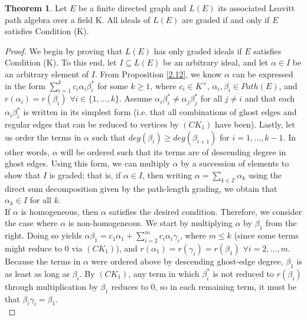 \documentclass[12pt]{amsart}
\theoremstyle{plain} \numberwithin{equation}{section}
\theoremstyle{definition}
\newtheorem{thm}{Theorem}
\theoremstyle{definition}
\begin{document}
\begin{thm}\label{2}
  Let $E$ be a finite directed graph and $L(E)$ its associated Leavitt path algebra over a field K. All ideals of $L(E)$ are graded if and only if $E$ satisfies Condition (K).
\end{thm}
\begin{proof} We begin by proving that $L(E)$ has only graded ideals if $E$ satisfies Condition (K). To this end, let $I\subseteq L(E)$ be an arbitrary ideal, and let $\alpha\in I$ be an arbitrary element of $I$. From Proposition \ref{2.12}, we know $\alpha$ can be expressed in the form $\sum_{i=1}^k c_i\alpha_i\beta_i^*$ for some $k\geq1$, where $c_i\in K^\times$, $\alpha_i,\beta_i\in Path(E)$, and $r(\alpha_i) = r(\beta_i)$ $\forall i\in \{1,\dots ,k\}$. Assume $\alpha_i\beta_i^* \neq \alpha_j\beta_j^*$ for all $j\neq i$ and that each $\alpha_i\beta_i^*$ is written in its simplest form (i.e. that all combinations of ghost edges and regular edges that can be reduced to vertices by $(CK_1)$ have been). Lastly, let us order the terms in $\alpha$ such that $deg(\beta_i)\geq deg(\beta_{i+1})$ for $i=1,\dots ,k-1$. In other words, $\alpha$ will be ordered such that its terms are of descending degree in ghost edges. Using this form, we can multiply $\alpha$ by a succession of elements to show that $I$ is graded; that is, if $\alpha\in I$, then writing $\alpha = \sum_{k \in\mathbb{Z}} \alpha_k$ using the direct sum decomposition given by the path-length grading, we obtain that $\alpha_k \in I$ for all $k$. \\

If $\alpha$ is homogeneous, then $\alpha$ satisfies the desired condition. Therefore, we consider the case where $\alpha$ is non-homogeneous. We start by multiplying $\alpha$ by $\beta_1$ from the right. Doing so yields $\alpha\beta_1 = c_1\alpha_1 + \sum_{i=2}^mc_i\alpha_i\gamma_i$, where $m\leq k$ (since some terms might reduce to 0 via $(CK_1)$), and $r(\alpha_1) = r(\gamma_i) = r(\beta_1)$ $\forall i = 2,\dots ,m$. Because the terms in $\alpha$ were ordered above by descending ghost-edge degree, $\beta_1$ is as least as long as $\beta_i$. By $(CK_1)$, any term in which $\beta_i^*$ is not reduced to $r(\beta_i)$ through multiplication by $\beta_1$ reduces to 0, so in each remaining term, it must be that $\beta_i\gamma_i = \beta_1$. \\


\end{proof}
\end{document}
